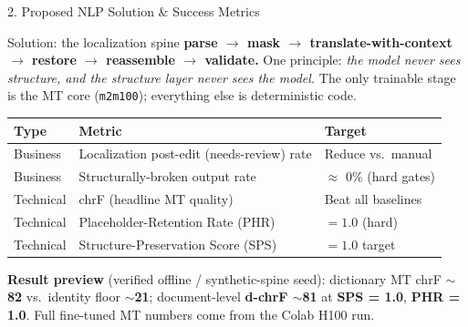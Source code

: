 \documentclass[10pt,aspectratio=169]{beamer}
\begin{document}
\begin{frame}{2. Proposed NLP Solution \& Success Metrics}
\begin{block}{Solution: the localization spine}
\textbf{parse $\rightarrow$ mask $\rightarrow$ translate-with-context $\rightarrow$ restore $\rightarrow$ reassemble $\rightarrow$ validate.} One principle: \emph{the model never sees structure, and the structure layer never sees the model.} The only trainable stage is the MT core (\texttt{m2m100}); everything else is deterministic code.
\end{block}

\begin{table}[h]
\centering\small
\begin{tabular}{lll}
\toprule
\textbf{Type} & \textbf{Metric} & \textbf{Target} \\
\midrule
Business  & Localization post-edit (needs-review) rate & Reduce vs.\ manual \\
Business  & Structurally-broken output rate            & $\approx$ 0\% (hard gates) \\
Technical & chrF (headline MT quality)                 & Beat all baselines \\
Technical & Placeholder-Retention Rate (PHR)           & $=1.0$ (hard) \\
Technical & Structure-Preservation Score (SPS)         & $=1.0$ target \\
\bottomrule
\end{tabular}
\end{table}

\textbf{Result preview} (verified offline / synthetic-spine seed): dictionary MT chrF \textbf{$\sim$82} vs.\ identity floor \textbf{$\sim$21}; document-level \textbf{d-chrF $\sim$81} at \textbf{SPS = 1.0}, \textbf{PHR = 1.0}. Full fine-tuned MT numbers come from the Colab H100 run.
\end{frame}
\end{document}
